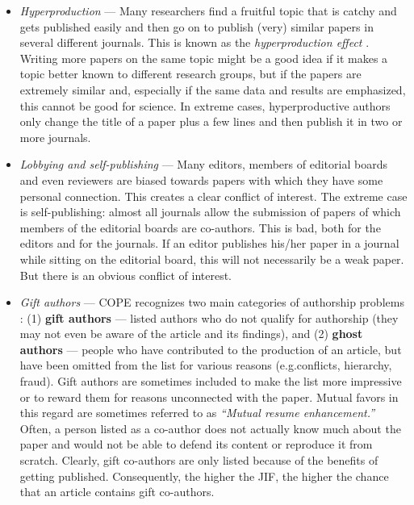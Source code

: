 \documentclass[graybox,envcountchap,sectrefs,UStrade]{svmono}
\begin{document}
\begin{itemize}

\item \emph{Hyperproduction} --- Many researchers find a fruitful topic that is catchy and gets published easily and then go on to publish (very) similar papers in several different journals. This is known as the \emph{hyperproduction effect} \citep{Newman2000DM}. Writing more papers on the same topic might be a good idea if it makes a topic better known to different research groups, but if the papers are extremely similar and, especially if the same data and results are emphasized, this cannot be good for science. In extreme cases, hyperproductive authors only change the title of a paper plus a few lines and then publish it in two or more journals.
\item \emph{Lobbying and self-publishing} --- Many editors, members of editorial boards and even reviewers are biased towards papers with which they have some personal connection. This creates a clear conflict of interest. The extreme case is self-publishing: almost all journals allow the submission of papers of which members of the editorial boards are co-authors. This is bad, both for the editors and for the journals. If an editor publishes his/her paper in a journal while sitting on the editorial board, this will not necessarily be a weak paper. But there is an obvious conflict of interest.
\item \emph{Gift authors} --- COPE recognizes two main categories of authorship problems \citep{Wager2007PLSM}: (1) \textbf{gift authors} --- listed authors who do not qualify for authorship (they may not even be aware of the article and its findings), and (2) \textbf{ghost authors} --- people who have contributed to the production of an article, but have been omitted from the list for various reasons (e.g.\@ conflicts, hierarchy, fraud). Gift authors are sometimes included to make the list more impressive or to reward them for reasons unconnected with the paper. Mutual favors in this regard are sometimes referred to as \emph{``Mutual resume enhancement.''} Often, a person listed as a co-author does not actually know much about the paper and would not be able to defend its content or reproduce it from scratch. Clearly, gift co-authors are only listed because of the benefits of getting published. Consequently, the higher the JIF, the higher the chance that an article contains gift co-authors.
\end{itemize}
\end{document}
